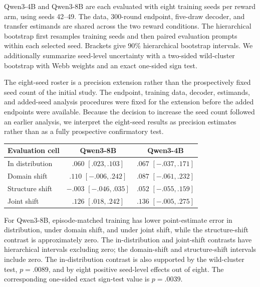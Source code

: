 Qwen3-4B and Qwen3-8B are each evaluated with eight training seeds per reward arm, using seeds 42--49.
The data, 300-round endpoint, five-draw decoder, and transfer estimands are shared across the two reward conditions.
The hierarchical bootstrap first resamples training seeds and then paired evaluation prompts within each selected seed.
Brackets give 90\% hierarchical bootstrap intervals. We additionally summarize seed-level uncertainty with a two-sided wild-cluster bootstrap with Webb weights and an exact one-sided sign test.

The eight-seed roster is a precision extension rather than the prospectively fixed seed count of the initial study.
The endpoint, training data, decoder, estimands, and added-seed analysis procedures were fixed for the extension before the added endpoints were available.
Because the decision to increase the seed count followed an earlier analysis, we interpret the eight-seed results as precision estimates rather than as a fully prospective confirmatory test.

\begin{center}
\begin{minipage}{0.82\linewidth}
\centering
{}
\label{tab:exp3-transfer-summary}
\small
\begin{tabular}{lcc}
\toprule
Evaluation cell & Qwen3-8B & Qwen3-4B \\
\midrule
In distribution & $.060$ $[.023,.103]$ & $.067$ $[-.037,.171]$ \\
Domain shift & $.110$ $[-.006,.242]$ & $.087$ $[-.061,.232]$ \\
Structure shift & $-.003$ $[-.046,.035]$ & $.052$ $[-.055,.159]$ \\
Joint shift & $.126$ $[.018,.242]$ & $.136$ $[-.005,.275]$ \\
\bottomrule
\end{tabular}
\end{minipage}
\end{center}

For Qwen3-8B, episode-matched training has lower point-estimate error in distribution, under domain shift, and under joint shift, while the structure-shift contrast is approximately zero.
The in-distribution and joint-shift contrasts have hierarchical intervals excluding zero; the domain-shift and structure-shift intervals include zero.
The in-distribution contrast is also supported by the wild-cluster test, \(p=.0089\), and by eight positive seed-level effects out of eight.
The corresponding one-sided exact sign-test value is \(p=.0039\).

